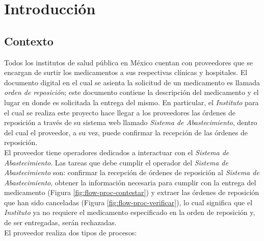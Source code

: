 \chapter{Introducción}\label{cap1}

\section{Contexto} \label{sec:intro-contexto}
Todos los institutos de salud pública en México cuentan con proveedores que se encargan de surtir los medicamentos a sus respectivas clínicas y hospitales. El documento digital en el cual se asienta la solicitud de un medicamento es llamada \textit{orden de reposición}; este documento contiene la descripción del medicamento y el lugar en donde es solicitada la entrega del mismo. En particular, el \textit{Instituto} para el cual se realiza este proyecto hace llegar a los proveedores las órdenes de reposición a través de su sistema web llamado \textit{Sistema de Abastecimiento}, dentro del cual el proveedor, a su vez, puede confirmar la recepción de las órdenes de reposición.\\
El proveedor tiene operadores dedicados a interactuar con el \textit{Sistema de Abastecimiento}. Las tareas que debe cumplir el operador del \textit{Sistema de Abastecimiento} son: confirmar la recepción de órdenes de reposición al \textit{Sistema de Abastecimiento}, obtener la información necesaria para cumplir con la entrega del medicamento (Figura \ref{fig:flow-proc-contestar}) y extraer las órdenes de reposición que han sido canceladas (Figura \ref{fig:flow-proc-verificar}), lo cual significa que el \textit{Instituto} ya no requiere el medicamento especificado en la orden de reposición y, de ser entregadas, serán rechazadas.\\
El proveedor realiza dos tipos de procesos:
